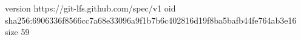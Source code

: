 version https://git-lfs.github.com/spec/v1
oid sha256:6906336f8566cc7a68e33096a9f1b7b6c402816d19f8ba5bafb44fe764ab3e16
size 59
